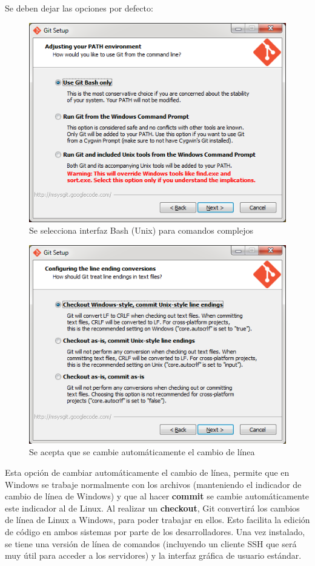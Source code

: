 \documentclass[12pt, spanish, oneside, onecolumn, a4paper]{report}
\begin{document}
Se deben dejar las opciones por defecto: 
\begin{figure}[hb] 
  \begin{center} 
    \includegraphics[width=.45\textwidth,keepaspectratio=true]{4.png} 
  \end{center} 
  \caption{Se selecciona interfaz Bash (Unix) para comandos complejos} 
\end{figure} 
\begin{figure}[hb] 
  \begin{center} 
    \includegraphics[width=.45\textwidth,keepaspectratio=true]{5.png} 
  \end{center} 
  \caption{Se acepta que se cambie automáticamente el cambio de línea} 
\end{figure} Esta opción de cambiar automáticamente el cambio de línea, permite que en Windows se trabaje normalmente con los archivos (manteniendo el indicador de cambio de línea de Windows) y que al hacer \textbf{commit} se cambie automáticamente este indicador al de Linux. Al realizar un \textbf{checkout}, Git convertirá los cambios de línea de Linux a Windows, para poder trabajar en ellos. Esto facilita la edición de código en ambos sistemas por parte de los desarrolladores. 
\clearpage
Una vez instalado, se tiene una versión de línea de comandos (incluyendo un cliente SSH que será muy útil para acceder a los servidores) y la interfaz gráfica de usuario estándar. 
\end{document}
